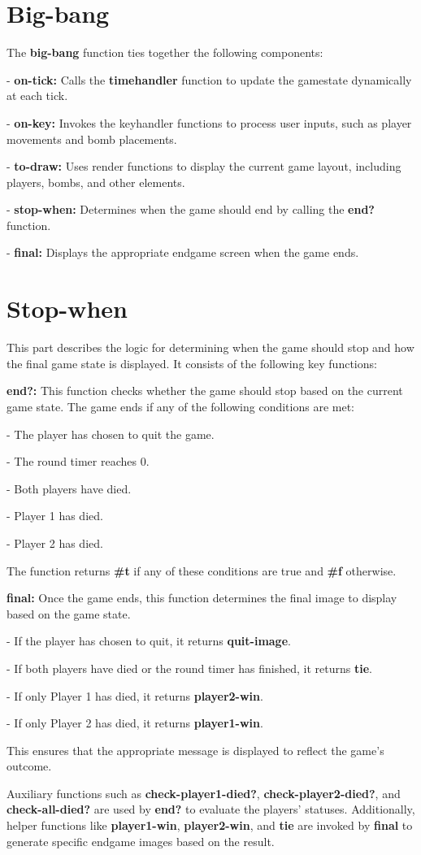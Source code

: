 \documentclass[12pt]{article}
\begin{document}
\section{Big-bang}
\hspace{1.27cm}The \textbf{big-bang} function ties together the following components:

- \textbf{on-tick:} Calls the \textbf{timehandler} function to update the gamestate dynamically at each tick.

- \textbf{on-key:} Invokes the keyhandler functions to process user inputs, such as player movements and bomb placements.

- \textbf{to-draw:} Uses render functions to display the current game layout, including players, bombs, and other elements.

- \textbf{stop-when:} Determines when the game should end by calling the \textbf{end?} function.

- \textbf{final:} Displays the appropriate endgame screen when the game ends.

\section{Stop-when}
\hspace{1.27cm}This part describes the logic for determining when the game should stop and how the final game state is displayed. It consists of the following key functions:

\textbf{end?:} This function checks whether the game should stop based on the current game state. The game ends if any of the following conditions are met:

- The player has chosen to quit the game.

- The round timer reaches 0.

- Both players have died.

- Player 1 has died.

- Player 2 has died.

The function returns \textbf{\#t} if any of these conditions are true and \textbf{\#f} otherwise.

\textbf{final:} Once the game ends, this function determines the final image to display based on the game state. 

- If the player has chosen to quit, it returns \textbf{quit-image}.

- If both players have died or the round timer has finished, it returns \textbf{tie}.

- If only Player 1 has died, it returns \textbf{player2-win}.

- If only Player 2 has died, it returns \textbf{player1-win}.

This ensures that the appropriate message is displayed to reflect the game's outcome.

Auxiliary functions such as \textbf{check-player1-died?}, \textbf{check-player2-died?}, and \textbf{check-all-died?} are used by \textbf{end?} to evaluate the players' statuses. Additionally, helper functions like \textbf{player1-win}, \textbf{player2-win}, and \textbf{tie} are invoked by \textbf{final} to generate specific endgame images based on the result.
\end{document}

